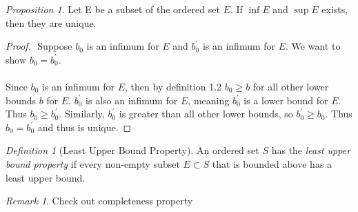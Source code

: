 \documentclass{article}
\theoremstyle{theorem}
\theoremstyle{definition}
\theoremstyle{proposition}
\theoremstyle{remark}
\newtheorem{definition}{Definition}[section]
\newtheorem{proposition}{Proposition}[section]
\newtheorem*{remark}{Remark}
\begin{document}
\begin{proposition}
    Let E be a subset of the ordered set $E$. If $\inf E$ and $\sup E$ exists, then they are unique.
\end{proposition}

\begin{proof}
    $ $\newline
    Suppose $b_0$ is an infimum for $E$ and $b_0^\prime$ is an infimum for $E$. We want to show $b_0 = b_0^\prime$. \\ \\
    Since $b_0$ is an infimum for $E$, then by definition 1.2 $b_0 \geq b$ for all other lower bounds $b$ for $E$. $b_0^\prime$ is also an infimum for $E$, meaning $b_0^\prime$ is a lower bound for $E$. Thus $b_0 \geq b_0^\prime$. Similarly, $b_0^\prime$ is greater than all other lower bounds, so $b_0^\prime \geq b_0$. Thus $b_0 = b_0^\prime$ and thus is unique.
\end{proof}

\begin{definition}[Least Upper Bound Property]
   An ordered set $S$  has the \emph{least upper bound property} if every non-empty subset $E \subset S$ that is bounded above has a least upper bound.
\end{definition}

\begin{remark}
    Check out completeness property
\end{remark}
\end{document}
